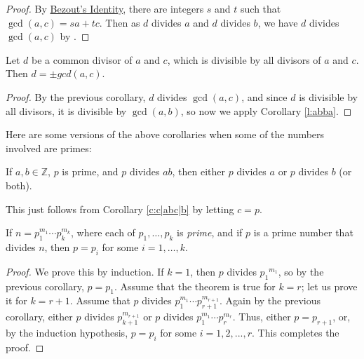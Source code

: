 \documentclass[11pt,dvipsnames]{book}
\numberwithin{figure}{section} %
\numberwithin{table}{section} %
\begin{document}
\begin{proof}
By  \hyperref[t:lincombgcd]{ Bezout's Identity}, there are integers $s$ and $t$ such that
$\gcd(a,c)=sa+tc$.
 Then as $d$ divides $a$ and $d$ divides $b$, we have $d$ divides $\gcd(a,c)$ by \easylemma.
\end{proof}

\begin{corollary} Let $d$ be a common divisor of
 $a$ and $c$, which is divisible by all divisors of $a$ and $c$. Then $d = \pm gcd(a,c)$.
\end{corollary}

\begin{proof}
By the previous corollary, $d$ divides $\gcd(a,c)$, and since $d$ is divisible by all divisors, it is divisible by $\gcd(a,b)$, so now we apply Corollary \ref{l:abba}.
\end{proof}

Here are some versions of the above corollaries when some of the numbers involved are primes:

\begin{corollary}
\label{c:p|ab}
If $a,b\in\mathbb{Z}$, $p$ is prime, and $p$ divides $ab$, then either $p$ divides $a$ or $p$ divides $b$ (or both).
\end{corollary}

This just follows from Corollary \ref{c:c|abc|b} by letting $c=p$.

%
 \begin{corollary}
 \label{c:p|p...p}
If $n=p_1^{m_1}\cdots p_k^{m_k}$, where each of $p_1,\dots,p_k$ is \emph{prime}, and if $p$ is a prime number that divides $n$, then $p=p_i$ for some $i=1,\ldots, k$.
\end{corollary}

\begin{proof}
We prove this by induction.
If $k=1$, then $p$ divides ${p_1}^{m_1}$, so by the previous corollary, $p=p_1$.
Assume that the theorem is true for $k=r$; let us prove it for $k=r+1$.
Assume that $p$ divides $p_{1}^{m_1}\cdots p_{r+1}^{m_{r+1}}$.
Again by the previous corollary, either $p$ divides $p_{k+1}^{m_{r+1}}$ or $p$ divides $p_1^{m_1}\cdots p_r^{m_r}$.
Thus, either $p=p_{r+1}$, or, by the induction hypothesis, $p=p_i$ for some $i=1,2,...,r$. This completes the proof.
\end{proof}
\end{document}
